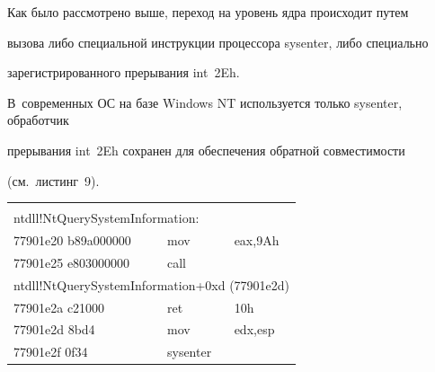   


  Как было рассмотрено выше, переход на уровень ядра происходит путем 


вызова либо специальной инструкции процессора {\sf sysenter}, либо специально 


зарегистрированного прерывания {\sf int~2Eh}. 


В~современных ОС на базе Windows NT используется только {\sf sysenter}, обработчик 


прерывания {\sf int~2Eh} сохранен для обеспечения обратной совместимости


(см.\ листинг~9).


\begin{table}\small %


\vspace*{3pt}


\begin{center}












\begin{tabular}{|lll|}


\hline


&&\\[-9pt]


\multicolumn{3}{|l|}{{\sf ntdll!NtQuerySystemInformation:}}\\


{\sf 77901e20 b89a000000}&{\sf     mov}&    {\sf eax,9Ah}\\


{\sf 77901e25 e803000000}&    {\sf call}&\\


\multicolumn{3}{|l|}{{\sf ntdll!NtQuerySystemInformation+0xd (77901e2d)}}\\


{\sf 77901e2a c21000} &  {\sf  ret} &{\sf 10h}\\


{\sf 77901e2d 8bd4  } &  {\sf  mov}&  {\sf   edx,esp}\\


{\sf 77901e2f 0f34  }     &   {\sf sysenter}&\\


\hline


\end{tabular}






\end{center}
\end{table}

